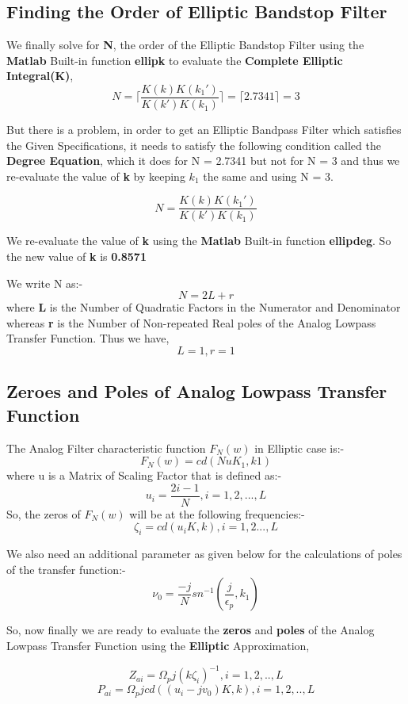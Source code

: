 \documentclass[12pt]{article}
\begin{document}
\subsection{Finding the Order of Elliptic Bandstop Filter}

We finally solve for \textbf{N}, the order of the Elliptic Bandstop Filter using the \textbf{Matlab} Built-in function \textbf{ellipk} to evaluate the \textbf{Complete Elliptic Integral(K)},
\[N = \lceil {\frac{K(k)K(k_{1}')}{K(k')K(k_{1})}} \rceil = \lceil 2.7341 \rceil = 3\]

But there is a problem, in order to get an Elliptic Bandpass Filter which satisfies the Given Specifications, it needs to satisfy the following condition called the \textbf{Degree Equation}, which it does for N = 2.7341 but not for N = 3 and thus we re-evaluate the value of \textbf{k} by keeping $k_{1}$ the same and using N = 3.

\[N = \frac{K(k)K(k_{1}')}{K(k')K(k_{1})}\]

We re-evaluate the value of \textbf{k} using the \textbf{Matlab} Built-in function \textbf{ellipdeg}. So the new value of \textbf{k} is \textbf{0.8571}

We write N as:-
\[N = 2L + r\]
where \textbf{L} is the Number of Quadratic Factors in the Numerator and Denominator whereas \textbf{r} is the Number of Non-repeated Real poles of the Analog Lowpass Transfer Function.
Thus we have,
\[L = 1, r = 1\]


\subsection{Zeroes and Poles of Analog Lowpass Transfer Function}

The Analog Filter characteristic function $F_{N}(w)$ in Elliptic case is:-
\[F_{N}(w) = cd(NuK_{1}, k1)\] where u is a Matrix of Scaling Factor that is defined as:-
\[u_{i} = \frac{2i - 1}{N}, i = 1, 2,..., L\]
So, the zeros of $F_{N}(w)$ will be at the following frequencies:-
\[\zeta_{i} = cd(u_{i}K,k),  i = 1,2...,L\]

We also need an additional parameter as given below for the calculations of poles of the transfer function:-
\[\nu_{0} = \frac{-j}{N}sn^{-1}(\frac{j}{\epsilon_{p}},k_{1})\]

So, now finally we are ready to evaluate the \textbf{zeros} and \textbf{poles} of the Analog Lowpass Transfer Function using the \textbf{Elliptic} Approximation,

\[Z_{ai} = \Omega_{p}j(k\zeta_{i})^{-1}, i = 1,2,..,L\]
\[P_{ai} = \Omega_{p}j cd((u_{i} - jv_{0})K,k), i = 1,2,..,L\]
\end{document}
